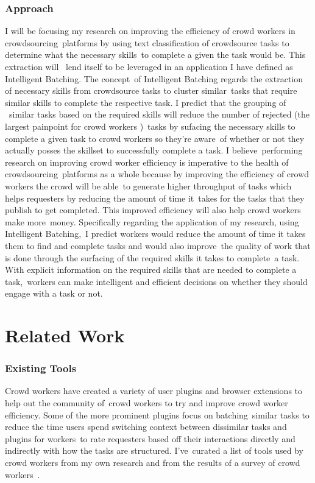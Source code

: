 \documentclass[letterpaper,12pt]{article}
\begin{document}
\subsection{Approach}
I will be focusing my research on improving the efficiency of crowd workers in crowdsourcing\
platforms by using text classification of crowdsource tasks to determine  what the necessary skills\
to complete a given the task would be. This extraction will \ 
lend itself to be leveraged in an application I have defined as Intelligent Batching. The concept\ 
of Intelligent Batching regards the extraction of necessary skills from crowdsource tasks to cluster similar\ 
tasks that require similar skills to complete the respective task. I predict that the grouping of \ 
similar tasks based on the required skills will reduce the number of rejected (the largest painpoint for crowd workers \cite{Kaplan2018})\
tasks by sufacing the necessary skills to complete a given task to crowd workers so they're aware\
of whether or not they actually posses the skillset to successfully complete a task. I believe\
performing research on improving crowd worker efficiency is imperative to the health of crowdsourcing\
platforms as a whole because by improving the efficiency of crowd workers the crowd will be able\
to generate higher throughput of tasks which helps requesters by reducing the amount of time it\
takes for the tasks that they publish to get completed. This improved efficiency will also help crowd workers make more\
money. Specifically regarding the application of my research, using Intelligent Batching,\
I predict workers would reduce the amount of time it takes them to find and complete tasks and would also improve\
the quality of work that is done through the surfacing of the required skills it takes to complete\
a task. With explicit information on the required skills that are needed to complete a task,\
workers can make intelligent and efficient decisions on whether they should engage with a task or not.

\chapter{Related Work}

\subsection{Existing Tools}
Crowd workers have created a variety of user plugins and browser extensions to help out the community of\
crowd workers to try and improve crowd worker efficiency. Some of the more prominent plugins focus on batching\
similar tasks to reduce the time users spend switching context between dissimilar tasks and plugins for workers\
to rate requesters based off their interactions directly and indirectly with how the tasks are structured. I've\
curated a list of tools used by crowd workers from my own research and from the results of a survey of crowd workers\
\cite{Kaplan2018}. 
\end{document}
